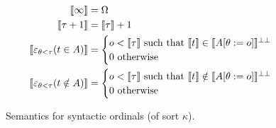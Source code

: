 \begin{figure}
  \begin{align*}
    \llbracket \infty \rrbracket &= \Omega\\
    \llbracket \tau+1 \rrbracket &= \llbracket \tau \rrbracket + 1\\
    \llbracket \varepsilon_{\theta<\tau}(t \in A) \rrbracket
      &= \begin{cases}
            o < \llbracket \tau \rrbracket \text{ such that }
              \llbracket t \rrbracket \in \llbracket A[\theta := o]
              \rrbracket^{\bot\bot}\\
            0 \text{ otherwise}
         \end{cases}\\
    \llbracket \varepsilon_{\theta<\tau}(t \notin A) \rrbracket
      &= \begin{cases}
            o < \llbracket \tau \rrbracket \text{ such that }
              \llbracket t \rrbracket \notin \llbracket A[\theta := o]
              \rrbracket^{\bot\bot}\\
            0 \text{ otherwise}
         \end{cases}
  \end{align*}
  \caption{Semantics for syntactic ordinals (of sort $\kappa$).}
  \label{semkappa}
\end{figure}

